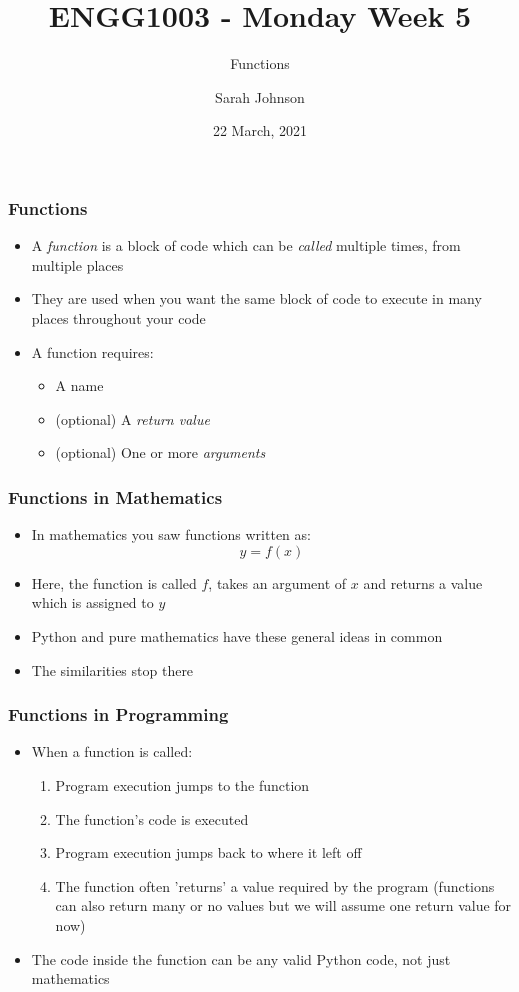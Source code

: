 \documentclass[english,14pt]{beamer}
\title{ENGG1003 - Monday Week 5}
\subtitle{Functions}
\author{Sarah Johnson}
\institute{University of Newcastle}
\date{22 March, 2021}
\begin{document}
\framebreak



\begin{frame}
\frametitle{Functions}
\begin{itemize}
\item A \textit{function} is a block of code which can be \textit{called} multiple times, from multiple places
\item They are used when you want the same block of code to execute in many places throughout your code
\item A function requires:
	\begin{itemize}
		\item A name
		\item (optional) A \textit{return value}
		\item (optional) One or more \textit{arguments}
	\end{itemize}
\end{itemize}
\end{frame}

\begin{frame}
\frametitle{Functions in Mathematics}
\begin{itemize}
\item In mathematics you saw functions written as:
\begin{equation*}
y = f(x)
\end{equation*}
\item Here, the function is called $f$, takes an argument of $x$ and returns a value which is assigned to $y$
\item Python and pure mathematics have these general ideas in common
 
\item The similarities stop there
\end{itemize}
\end{frame}

\begin{frame}[fragile]
\frametitle{Functions in Programming}
\begin{itemize}
\item When a function is called:
	\begin{enumerate}
		\item Program execution jumps to the function
		\item The function's code is executed
		\item Program execution jumps back to where it left off
		\item The function often 'returns' a value required by the program
		(functions can also return many or no values but we will assume one return value for now)
	\end{enumerate}
\item The code inside the function can be any valid Python code, not just mathematics
\end{itemize}
\end{frame}
\end{document}
